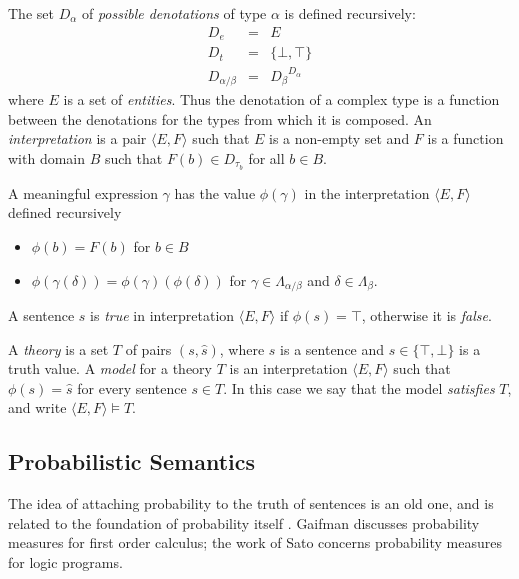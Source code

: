 \documentclass{svmult}
\begin{document}

The set $D_\alpha$ of \emph{possible denotations} of type $\alpha$ is
defined recursively:
\begin{eqnarray*}
D_e &=& E\\
D_t &=& \{\bot,\top\}\\
D_{\alpha/\beta} &=& {D_\beta}^{D_\alpha}
\end{eqnarray*}
where $E$ is a set of \emph{entities}. Thus the denotation of a
complex type is a function between the denotations for the types from
which it is composed. An \emph{interpretation} is a pair $\langle E,
F\rangle$ such that $E$ is a non-empty set and $F$ is a function with
domain $B$ such that $F(b) \in D_{\tau_b}$ for all $b\in B$.

A meaningful expression $\gamma$ has the value $\phi(\gamma)$ in the
interpretation $\langle E, F\rangle$ defined recursively
\begin{itemize}
\item $\phi(b) = F(b)$ for $b\in B$
\item $\phi(\gamma(\delta)) = \phi(\gamma)(\phi(\delta))$ for $\gamma
  \in \Lambda_{\alpha/\beta}$ and $\delta \in \Lambda_\beta$.
\end{itemize}
A sentence $s$ is \emph{true} in interpretation $\langle E, F\rangle$
if $\phi(s) = \top$, otherwise it is \emph{false}.

A \emph{theory} is a set $T$ of pairs $(s,\hat{s})$, where $s$ is a
sentence and $\hat{s}\in\{\top,\bot\}$ is a truth value. A
\emph{model} for a theory $T$ is an interpretation $\langle E,
F\rangle$ such that $\phi(s) = \hat{s}$ for every sentence $s\in
T$. In this case we say that the model \emph{satisfies} $T$, and write
$\langle E, F\rangle \models T$.

\subsection{Probabilistic Semantics}

The idea of attaching probability to the truth of sentences is an old
one, and is related to the foundation of probability itself
\cite{Keynes:21,Los:55}. Gaifman \cite{Gaifman:64} discusses probability
measures for first order calculus; the work of Sato \cite{Sato:95}
concerns probability measures for logic programs.

\end{document}
